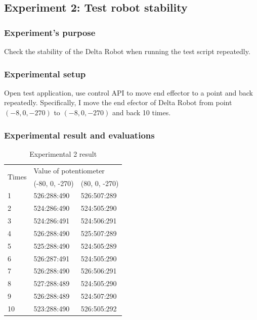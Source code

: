 
\subsection{Experiment 2: Test robot stability}
\subsubsection{Experiment's purpose}
Check the stability of the Delta Robot when running the test script repeatedly.
\subsubsection{Experimental setup}
Open test application, use control API to move end effector to a point and back repeatedly. Specifically, I move the end efector of Delta Robot from point $(-8, 0, -270)$ to $(-8, 0, -270)$ and back 10 times.

\subsubsection{Experimental result and evaluations}
\begin{table}[H]
\centering
\caption{Experimental 2 result}
\label{tab:experiment_2}
\begin{tabular}{|l|l|l|}
\hline
\multirow{2}{*}{Times} & \multicolumn{2}{l|}{Value of potentiometer} \\ \cline{2-3} 
                       & (-80, 0, -270)        & (80, 0, -270)       \\ \hline
1                      & 526:288:490           & 526:507:289         \\ \hline
2                      & 524:286:490           & 524:505:290         \\ \hline
3                      & 524:286:491           & 524:506:291         \\ \hline
4                      & 526:288:490           & 525:507:289         \\ \hline
5                      & 525:288:490           & 524:505:289         \\ \hline
6                      & 526:287:491           & 524:505:290         \\ \hline
7                      & 526:288:490           & 526:506:291         \\ \hline
8                      & 527:288:489           & 524:505:290         \\ \hline
9                      & 526:288:489           & 524:507:290         \\ \hline
10                     & 523:288:490           & 526:505:292         \\ \hline
\end{tabular}
\end{table}

